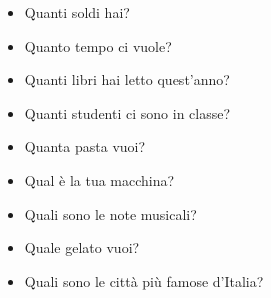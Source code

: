 \documentclass[letter,11pt]{article}
\begin{document}
\vskip 0.5in

\begin{multicols}{2}
\begin{itemize}
    \item Quanti soldi hai?
    \item Quanto tempo ci vuole?
    \item Quanti libri hai letto quest'anno?
    \item Quanti studenti ci sono in classe?
    \item Quanta pasta vuoi?
    \item Qual è la tua macchina?
    \item Quali sono le note musicali?
    \item Quale gelato vuoi?
    \item Quali sono le città più famose d'Italia?


\end{itemize}
\end{multicols}
\end{document}
